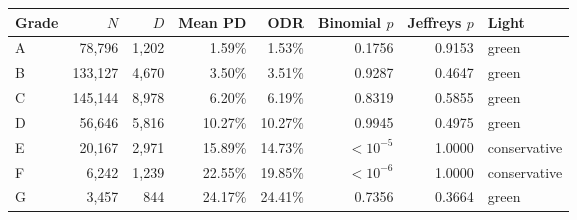 \begin{tabular}{lrrrrrrl}
\toprule
Grade & $N$ & $D$ & Mean PD & ODR & Binomial $p$ & Jeffreys $p$ & Light \\
\midrule
A & 78,796 & 1,202 & 1.59\% & 1.53\% & 0.1756 & 0.9153 & green \\
B & 133,127 & 4,670 & 3.50\% & 3.51\% & 0.9287 & 0.4647 & green \\
C & 145,144 & 8,978 & 6.20\% & 6.19\% & 0.8319 & 0.5855 & green \\
D & 56,646 & 5,816 & 10.27\% & 10.27\% & 0.9945 & 0.4975 & green \\
E & 20,167 & 2,971 & 15.89\% & 14.73\% & $<10^{-5}$ & 1.0000 & conservative \\
F & 6,242 & 1,239 & 22.55\% & 19.85\% & $<10^{-6}$ & 1.0000 & conservative \\
G & 3,457 & 844 & 24.17\% & 24.41\% & 0.7356 & 0.3664 & green \\
\bottomrule
\end{tabular}
